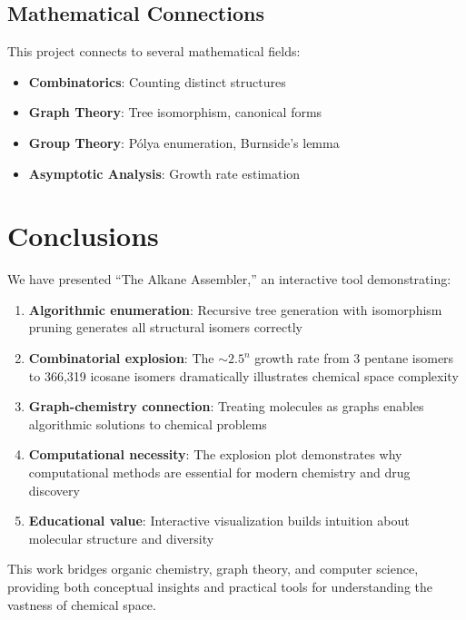 \documentclass[conference]{IEEEtran}
\begin{document}
\subsection{Mathematical Connections}

This project connects to several mathematical fields:
\begin{itemize}
    \item \textbf{Combinatorics}: Counting distinct structures
    \item \textbf{Graph Theory}: Tree isomorphism, canonical forms
    \item \textbf{Group Theory}: Pólya enumeration, Burnside's lemma
    \item \textbf{Asymptotic Analysis}: Growth rate estimation
\end{itemize}

\section{Conclusions}

We have presented ``The Alkane Assembler,'' an interactive tool demonstrating:

\begin{enumerate}
    \item \textbf{Algorithmic enumeration}: Recursive tree generation with isomorphism pruning generates all structural isomers correctly
    
    \item \textbf{Combinatorial explosion}: The $\sim 2.5^n$ growth rate from 3 pentane isomers to 366,319 icosane isomers dramatically illustrates chemical space complexity
    
    \item \textbf{Graph-chemistry connection}: Treating molecules as graphs enables algorithmic solutions to chemical problems
    
    \item \textbf{Computational necessity}: The explosion plot demonstrates why computational methods are essential for modern chemistry and drug discovery
    
    \item \textbf{Educational value}: Interactive visualization builds intuition about molecular structure and diversity
\end{enumerate}

This work bridges organic chemistry, graph theory, and computer science, providing both conceptual insights and practical tools for understanding the vastness of chemical space.
\end{document}
